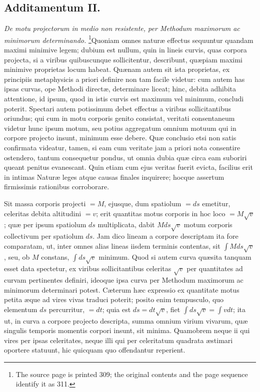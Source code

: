 \subsection*{Additamentum II.}
\textit{De motu projectorum in medio non resistente, per Methodum maximorum ac minimorum determinando.}
\footnote{The source page is printed 309; the original contents and the page sequence identify it as 311.}Quoniam omnes naturæ effectus sequuntur quandam maximi minimive legem; dubium est nullum, quin in lineis curvis, quas corpora projecta, si a viribus quibuscunque sollicitentur, describunt, quæpiam maximi minimive proprietas locum habeat. Quænam autem sit ista proprietas, ex principiis metaphysicis a priori definire non tam facile videtur: cum autem has ipsas curvas, ope Methodi directæ, determinare liceat; hinc, debita adhibita attentione, id ipsum, quod in istis curvis est maximum vel minimum, concludi poterit. Spectari autem potissimum debet effectus a viribus sollicitantibus oriundus; qui cum in motu corporis genito consistat, veritati consentaneum videtur hunc ipsum motum, seu potius aggregatum omnium motuum qui in corpore projecto insunt, minimum esse debere. Quæ conclusio etsi non satis confirmata videatur, tamen, si eam cum veritate jam a priori nota consentire ostendero, tantum consequetur pondus, ut omnia dubia quæ circa eam suboriri queant penitus evanescant. Quin etiam cum ejus veritas fuerit evicta, facilius erit in intimas Naturæ leges atque causas finales inquirere; hocque assertum firmissimis rationibus corroborare.

Sit massa corporis projecti $=M$, ejusque, dum spatiolum $=ds$ emetitur, celeritas debita altitudini $=v$; erit quantitas motus corporis in hoc loco $=M\sqrt v$; quæ per ipsum spatiolum $ds$ multiplicata, dabit $Mds\sqrt v$ motum corporis collectivum per spatiolum $ds$. Jam dico lineam a corpore descriptam ita fore comparatam, ut, inter omnes alias lineas iisdem terminis contentas, sit $\int Mds\sqrt v$, seu, ob $M$ constans, $\int ds\sqrt v$ minimum. Quod si autem curva quæsita tanquam esset data spectetur, ex viribus sollicitantibus celeritas $\sqrt v$ per quantitates ad curvam pertinentes definiri, ideoque ipsa curva per Methodum maximorum ac minimorum determinari potest. Cæterum hæc expressio ex quantitate motus petita æque ad vires vivas traduci poterit; posito enim tempusculo, quo elementum $ds$ percurritur, $=dt$; quia est $ds=dt\sqrt v$, fiet $\int ds\sqrt v=\int vdt$; ita ut, in curva a corpore projecto descripta, summa omnium virium vivarum, quæ singulis temporis momentis corpori insunt, sit minima. Quamobrem neque ii qui vires per ipsas celeritates, neque illi qui per celeritatum quadrata æstimari oportere statuunt, hic quicquam quo offendantur reperient.


